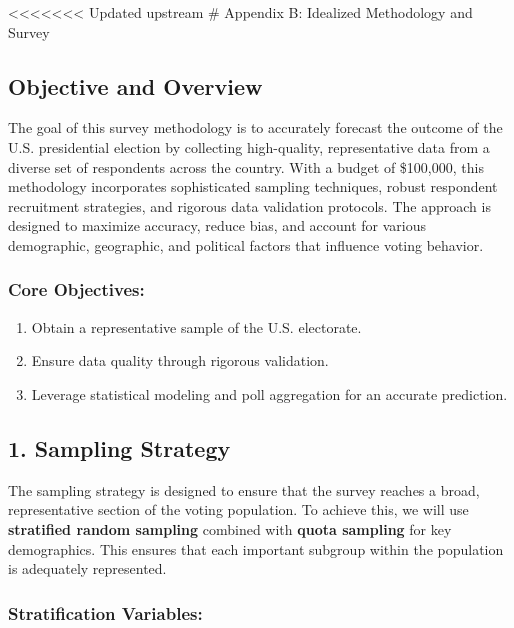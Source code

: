 \documentclass[
  letterpaper,
  DIV=11,
  numbers=noendperiod]{scrartcl}
\providecommand{\tightlist}{%
  \setlength{\itemsep}{0pt}\setlength{\parskip}{0pt}}\usepackage{longtable,booktabs,array}
\begin{document}
\textless\textless\textless\textless\textless\textless\textless{}
Updated upstream \# Appendix B: Idealized Methodology and Survey

\subsection{\texorpdfstring{\textbf{Objective and
Overview}}{Objective and Overview}}\label{objective-and-overview}

The goal of this survey methodology is to accurately forecast the
outcome of the U.S. presidential election by collecting high-quality,
representative data from a diverse set of respondents across the
country. With a budget of \$100,000, this methodology incorporates
sophisticated sampling techniques, robust respondent recruitment
strategies, and rigorous data validation protocols. The approach is
designed to maximize accuracy, reduce bias, and account for various
demographic, geographic, and political factors that influence voting
behavior.

\subsubsection{\texorpdfstring{\textbf{Core
Objectives}:}{Core Objectives:}}\label{core-objectives}

\begin{enumerate}
\def\labelenumi{\arabic{enumi}.}
\tightlist
\item
  Obtain a representative sample of the U.S. electorate.
\item
  Ensure data quality through rigorous validation.
\item
  Leverage statistical modeling and poll aggregation for an accurate
  prediction.
\end{enumerate}

\subsection{\texorpdfstring{\textbf{1. Sampling
Strategy}}{1. Sampling Strategy}}\label{sampling-strategy}

The sampling strategy is designed to ensure that the survey reaches a
broad, representative section of the voting population. To achieve this,
we will use \textbf{stratified random sampling} combined with
\textbf{quota sampling} for key demographics. This ensures that each
important subgroup within the population is adequately represented.

\subsubsection{\texorpdfstring{\textbf{Stratification
Variables}:}{Stratification Variables:}}\label{stratification-variables}
\end{document}

